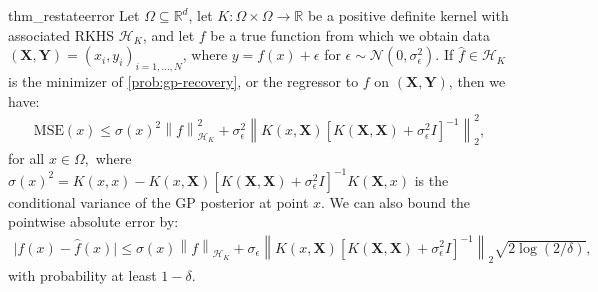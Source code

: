 \documentclass{article}
\theoremstyle{definition}
\theoremstyle{remark}
\newcommand{\norm}[1]{\left \lVert #1 \right \rVert}
\begin{document}
\begin{restatable}[]{thm_restate}{error}\label{lem:error}
Let $\Omega\subseteq\mathbb{R}^d$, let $K:\Omega\times\Omega\rightarrow\mathbb{R}$ be a positive definite kernel with associated RKHS $\mathcal{H}_{K}$, and let $f$ be a true function from which we obtain data $(\mathbf{X},\mathbf{Y})=(x_i,y_i)_{i=1,...,N}$, where $y=f(x)+\epsilon$ for $\epsilon\sim\mathcal{N}(0,\sigma_{\epsilon}^2)$. If $\hat{f}\in\mathcal{H}_K$ is the minimizer of \eqref{prob:gp-recovery}, or the regressor to $f$ on $(\mathbf{X},\mathbf{Y})$, then we have:
\begin{align}
    \text{MSE}(x)\leq \sigma(x)^2 \norm{f}^2_{\mathcal{H}_K}+\sigma_{\epsilon}^2\norm{K(x,\mathbf{X})[K(\mathbf{X},\mathbf{X})+\sigma_{\epsilon}^2 I]^{-1}}_2^2,
\end{align}
for all $x\in\Omega,$ where $\sigma(x)^2=K(x,x)-K(x,\mathbf{X})[K(\mathbf{X},\mathbf{X})+\sigma_{\epsilon}^2 I]^{-1}K(\mathbf{X},x)$ is the conditional variance of the GP posterior at point $x$. We can also bound the pointwise absolute error by:
\begin{align}
    \lvert f(x)-\hat{f}(x)\rvert\leq \sigma(x)\norm{f}_{\mathcal{H}_K} +\sigma_{\epsilon}\norm{K(x,\mathbf{X})[K(\mathbf{X},\mathbf{X})+\sigma_{\epsilon}^2 I]^{-1}}_2\sqrt{2\log(2/\delta)},
\end{align}
with probability at least $1-\delta$.
\end{restatable}
\end{document}
